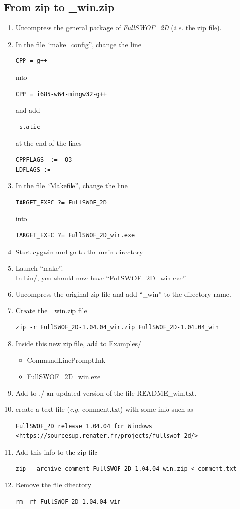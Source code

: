 \documentclass[a4paper, 11pt]{article}
\newcommand{\FullSWOFtwoD}{\emph{FullSWOF\_2D}}
\begin{document}
\subsection{From zip to \_win.zip}
\begin{enumerate}
\item Uncompress the general package of \FullSWOFtwoD{} (\emph{i.e.} the zip file).
\item In the file ``make\_config'', change the line
\begin{verbatim}
CPP = g++
\end{verbatim}
into
\begin{verbatim}
CPP = i686-w64-mingw32-g++
\end{verbatim}
and add
\begin{verbatim}
-static
\end{verbatim}
at the end of the lines
\begin{verbatim}
CPPFLAGS  := -O3
LDFLAGS :=
\end{verbatim}
\item In the file ``Makefile'', change the line
\begin{verbatim}
TARGET_EXEC ?= FullSWOF_2D
\end{verbatim}
into
\begin{verbatim}
TARGET_EXEC ?= FullSWOF_2D_win.exe
\end{verbatim}
\item Start cygwin and go to the main directory.
\item Launch ``make''.\\
In bin/, you should now have ``FullSWOF\_2D\_win.exe''.
\item Uncompress the original zip file and add ``\_win'' to the directory name.
\item Create the \_win.zip file
\begin{verbatim}
zip -r FullSWOF_2D-1.04.04_win.zip FullSWOF_2D-1.04.04_win
\end{verbatim}
\item Inside this new zip file, add to Examples/
	\begin{itemize}
		\item CommandLinePrompt.lnk
		\item FullSWOF\_2D\_win.exe
	\end{itemize}
\item Add to ./ an updated version of the file README\_win.txt.
\item create a text file (\emph{e.g.} comment.txt) with some info such as
\begin{verbatim}
FullSWOF_2D release 1.04.04 for Windows
<https://sourcesup.renater.fr/projects/fullswof-2d/>
\end{verbatim}
\item Add this info to the zip file
\begin{verbatim}
zip --archive-comment FullSWOF_2D-1.04.04_win.zip < comment.txt
\end{verbatim}
\item Remove the file directory
\begin{verbatim}
rm -rf FullSWOF_2D-1.04.04_win
\end{verbatim}


\end{enumerate}
\end{document}
